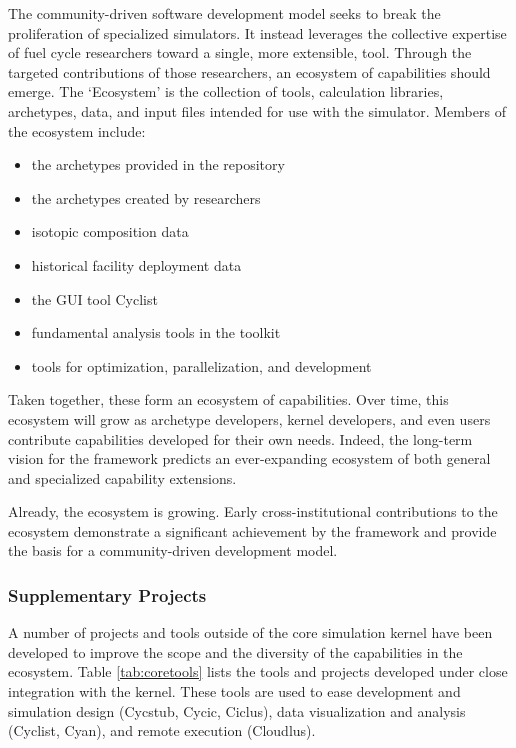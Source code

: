 The \Cyclus community-driven software development model seeks to break the
proliferation of specialized simulators. It instead leverages
the collective expertise of fuel cycle researchers toward a single, more
extensible, tool. Through the targeted
contributions of those researchers, an ecosystem of capabilities should emerge.
The \Cyclus `Ecosystem' is the collection of tools, calculation libraries,
archetypes, data, and input files intended for use with the \Cyclus simulator.
Members of the ecosystem include:
\begin{itemize}
\item the archetypes provided in the \Cycamore \cite{carlsen_cycamore_2014}
repository
\item the archetypes created by researchers
\item isotopic composition data
\item historical facility deployment data
\item the \Cyclus \gls{GUI} tool Cyclist
\item fundamental analysis tools in the \Cyclus toolkit
\item tools for \Cyclus optimization, parallelization, and development
\end{itemize}
Taken together, these form an ecosystem of capabilities. Over time, this
ecosystem will grow as archetype developers, kernel developers, and
even users contribute capabilities developed for their own needs. Indeed, the
long-term vision for the \Cyclus framework predicts an ever-expanding ecosystem
of both general and specialized capability extensions.

Already, the ecosystem is growing. Early cross-institutional contributions to
the ecosystem demonstrate a significant achievement by the \Cyclus framework
and provide the basis for a community-driven development model.

\subsubsection{Supplementary Projects}

A number of projects and tools outside of the core simulation kernel have been
developed to improve the scope and the diversity of the capabilities in the
\Cyclus ecosystem. Table \ref{tab:coretools} lists the tools and projects
developed under close integration with the \Cyclus kernel.  These tools are used
to ease development and simulation design (Cycstub, Cycic, Ciclus), data
visualization and analysis (Cyclist, Cyan), and remote execution (Cloudlus).

